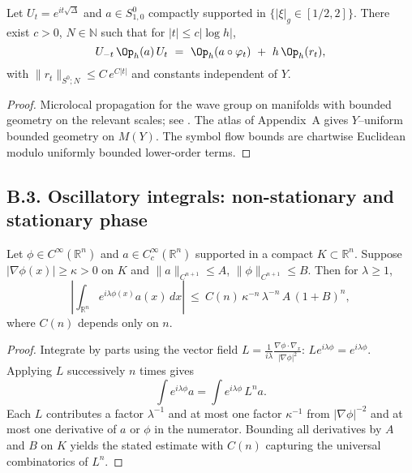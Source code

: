 \begin{theorem}\label{thm:B.2-Egorov}
Let $U_t=e^{it\sqrt\Delta}$ and $a\in S^0_{1,0}$ compactly supported in $\{|\xi|_g\in [1/2,2]\}$.
There exist $c>0$, $N\in\mathbb N$ such that for $|t|\le c|\log h|$,
\[
U_{-t}\,\Op_h(a)\,U_t \ =\ \Op_h(a\circ \varphi_t) \ + \ h\,\Op_h(r_t),
\]
with $\|r_t\|_{S^0;N} \le C\,e^{C|t|}$ and constants independent of $Y$.
\end{theorem}

\begin{proof}
Microlocal propagation for the wave group on manifolds with bounded geometry on the relevant scales; see
\cite[§11]{Zworski}. The atlas of Appendix~A gives $Y$–uniform bounded geometry on $M(Y)$.
The symbol flow bounds are chartwise Euclidean modulo uniformly bounded lower-order terms.
\end{proof}

\subsection*{B.3. Oscillatory integrals: non-stationary and stationary phase}

\begin{lemma}\label{lem:B.3-nonstat}
Let $\phi\in C^\infty(\mathbb R^n)$ and $a\in C_c^\infty(\mathbb R^n)$ supported in a compact
$K\subset\mathbb R^n$. Suppose $|\nabla\phi(x)|\ge \kappa>0$ on $K$ and
$\|a\|_{C^{n+1}}\le A$, $\|\phi\|_{C^{n+1}}\le B$. Then for $\lambda\ge 1$,
\[
\left|\int_{\mathbb R^n}e^{i\lambda\phi(x)}a(x)\,dx\right|
\ \le\ C(n)\,\kappa^{-n}\, \lambda^{-n}\, A\,(1+B)^{n},
\]
where $C(n)$ depends only on $n$.
\end{lemma}

\begin{proof}
Integrate by parts using the vector field
$L=\frac{1}{i\lambda}\frac{\nabla\phi\cdot\nabla_x}{|\nabla\phi|^2}$:
$Le^{i\lambda\phi}=e^{i\lambda\phi}$. Applying $L$ successively $n$ times gives
\[
\int e^{i\lambda\phi}a= \int e^{i\lambda\phi}\,L^n a.
\]
Each $L$ contributes a factor $\lambda^{-1}$ and at most one factor $\kappa^{-1}$ from
$|\nabla\phi|^{-2}$ and at most one derivative of $a$ or $\phi$ in the numerator.
Bounding all derivatives by $A$ and $B$ on $K$ yields the stated estimate with
$C(n)$ capturing the universal combinatorics of $L^n$.
\end{proof}

